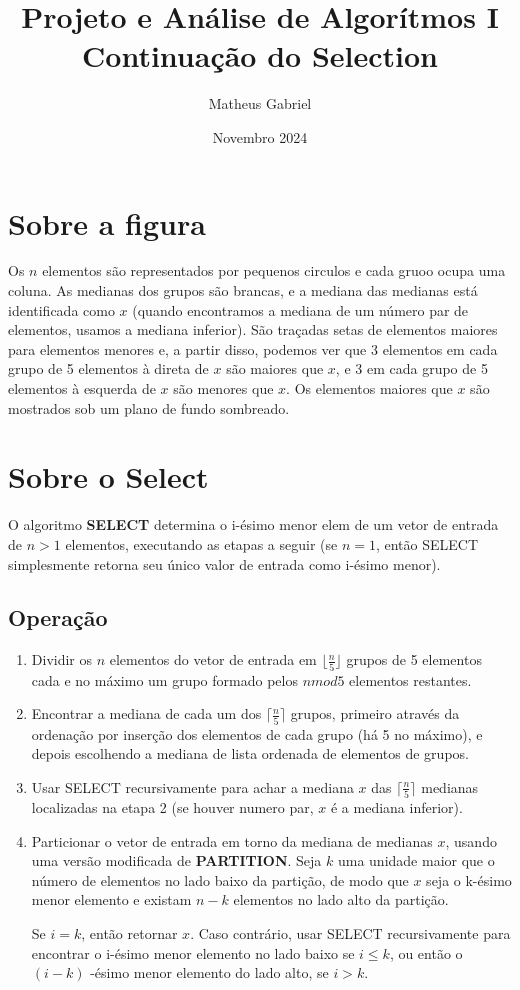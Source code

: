\documentclass[11pt]{article}
\author{Matheus Gabriel}
\date{Novembro 2024}
\title{Projeto e Análise de Algorítmos I\\\medskip
\large Continuação do Selection}
\begin{document}
\maketitle
\tableofcontents

\section{Sobre a figura}
\label{sec:org5a94824}

Os \(n\) elementos são representados por pequenos circulos e cada gruoo ocupa uma coluna. As medianas dos grupos são brancas, e a mediana das medianas está identificada como \(x\) (quando encontramos a mediana de um número par de elementos, usamos a mediana inferior). São traçadas setas de elementos maiores para elementos menores e, a partir disso, podemos ver que 3 elementos em cada grupo de 5 elementos à direta de \(x\) são maiores que \(x\), e 3 em cada grupo de 5 elementos à esquerda de \(x\) são menores que \(x\). Os elementos maiores que \(x\) são mostrados sob um plano de fundo sombreado.
\section{Sobre o Select}
\label{sec:org8c0ffbc}

O algoritmo \textbf{SELECT} determina o i-ésimo menor elem de um vetor de entrada de \(n >1\) elementos, executando as etapas a seguir (se \(n = 1\), então SELECT simplesmente retorna seu único valor de entrada como i-ésimo menor).
\subsection{Operação}
\label{sec:orgf65eda1}
\begin{enumerate}
\item Dividir os \(n\) elementos do vetor de entrada em \(\lfloor \frac{n}{5} \rfloor\) grupos de 5 elementos cada e no máximo um grupo formado pelos \(n mod 5\) elementos restantes.

\item Encontrar a mediana de cada um dos \(\lceil \frac{n}{5} \rceil\) grupos, primeiro através da ordenação por inserção dos elementos de cada grupo (há 5 no máximo), e depois escolhendo a mediana de lista ordenada de elementos de grupos.

\item Usar SELECT recursivamente para achar a mediana \(x\) das \(\lceil \frac{n}{5} \rceil\) medianas localizadas na etapa 2 (se houver numero par, \(x\) é a mediana inferior).

\item Particionar o vetor de entrada em torno da mediana de medianas \(x\), usando uma versão modificada de \textbf{PARTITION}. Seja \(k\) uma unidade maior que o número de elementos no lado baixo da partição, de modo que \(x\) seja o k-ésimo menor elemento e existam \(n-k\) elementos no lado alto da partição.

Se \(i = k\), então retornar \(x\). Caso contrário, usar SELECT recursivamente para encontrar o i-ésimo menor elemento no lado baixo se \(i \leq k\), ou então o \((i-k)\) -ésimo menor elemento do lado alto, se \(i >k\).
\end{enumerate}
\end{document}
